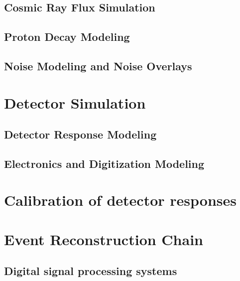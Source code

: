 \subsection{Cosmic Ray Flux Simulation}
\subsection{Proton Decay Modeling}
\subsection{Noise Modeling and Noise Overlays}

\section{Detector Simulation}
\subsection{Detector Response Modeling}
\subsection{Electronics and Digitization Modeling}

\section{Calibration of detector responses}

\section{Event Reconstruction Chain}
\subsection{Digital signal processing systems}

